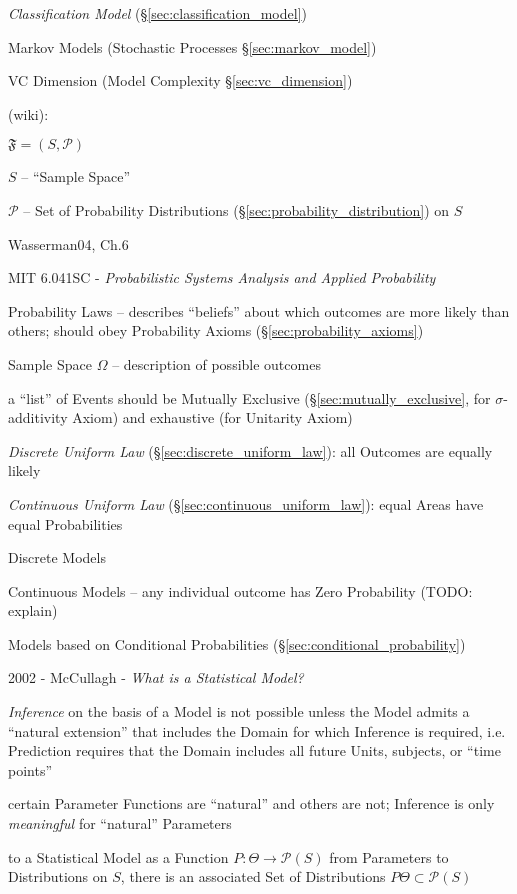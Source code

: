 \fist \emph{Classification Model} (\S\ref{sec:classification_model})

\fist Markov Models (Stochastic Processes \S\ref{sec:markov_model})

VC Dimension (Model Complexity \S\ref{sec:vc_dimension})

(wiki):

$\mathfrak{F} = (S, \mathcal{P})$

$S$ -- ``Sample Space''

$\mathcal{P}$ -- Set of Probability Distributions
(\S\ref{sec:probability_distribution}) on $S$

Wasserman04, Ch.6

\asterism

MIT 6.041SC - \emph{Probabilistic Systems Analysis and Applied Probability}

Probability Laws -- describes ``beliefs'' about which outcomes are more likely
than others; should obey Probability Axioms (\S\ref{sec:probability_axioms})

Sample Space $\Omega$ -- description of possible outcomes

a ``list'' of Events should be Mutually Exclusive
(\S\ref{sec:mutually_exclusive}, for $\sigma$-additivity Axiom) and exhaustive
(for Unitarity Axiom)

\emph{Discrete Uniform Law} (\S\ref{sec:discrete_uniform_law}): all Outcomes are
equally likely

\emph{Continuous Uniform Law} (\S\ref{sec:continuous_uniform_law}): equal Areas
have equal Probabilities

Discrete Models

Continuous Models -- any individual outcome has Zero Probability (TODO: explain)

Models based on Conditional Probabilities (\S\ref{sec:conditional_probability})

\asterism

2002 - McCullagh - \emph{What is a Statistical Model?}

\emph{Inference} on the basis of a Model is not possible unless the Model admits
a ``natural extension'' that includes the Domain for which Inference is
required, i.e. Prediction requires that the Domain includes all future Units,
subjects, or ``time points''

certain Parameter Functions are ``natural'' and others are not; Inference is
only \emph{meaningful} for ``natural'' Parameters

to a Statistical Model as a Function $P : \Theta \to \mathcal{P}(S)$
from Parameters to Distributions on $S$, there is an associated Set of
Distributions $P \Theta \subset \mathcal{P}(S)$

